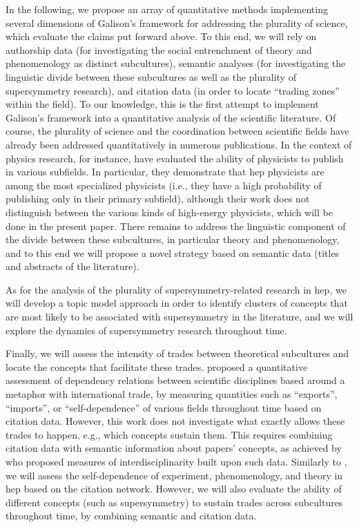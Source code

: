 \documentclass[smallextended]{svjour3}
\begin{document}
In the following, we propose an array of quantitative methods implementing several dimensions of Galison's framework for addressing the plurality of science, which evaluate the claims put forward above. To this end, we will rely on authorship data (for investigating the social entrenchment of theory and phenomenology as distinct subcultures), semantic analyses (for investigating the linguistic divide between these subcultures as well as the plurality of supersymmetry research), and citation data (in order to locate ``trading zones'' within the field). To our knowledge, this is the first attempt to implement Galison's framework into a quantitative analysis of the scientific literature. Of course, the plurality of science and the coordination between scientific fields have already been addressed quantitatively in numerous publications. In the context of physics research, for instance, \citet{Battiston2019} have evaluated the ability of physicists to publish in various subfields. In particular, they demonstrate that \gls{hep} physicists are among the most specialized physicists (i.e., they have a high probability of publishing only in their primary subfield), although their work does not distinguish between the various kinds of high-energy physicists, which will be done in the present paper. There remains to address the linguistic component of the divide between these subcultures, in particular theory and phenomenology, and to this end we will propose a novel strategy based on semantic data (titles and abstracts of the literature).

As for the analysis of the plurality of supersymmetry-related research in \gls{hep}, we will develop a topic model approach in order to identify clusters of concepts that are most likely to be associated with supersymmetry in the literature, and we will explore the dynamics of supersymmetry research throughout time.

Finally, we will assess the intensity of trades between theoretical subcultures and locate the concepts that facilitate these trades. \citet{Yan2013} proposed a quantitative assessment of dependency relations between scientific disciplines based around a metaphor with international trade, by measuring quantities such as ``exports'', ``imports'', or ``self-dependence'' of various fields throughout time based on citation data. However, this work does not investigate what exactly allows these trades to happen, e.g., which concepts sustain them. This requires combining citation data with semantic information about papers' concepts, as achieved by \citet{Raimbault2019} who proposed measures of interdisciplinarity built upon such data. Similarly to \citealt{Yan2013}, we will assess the self-dependence of experiment, phenomenology, and theory in \gls{hep} based on the citation network. However, we will also evaluate the ability of different concepts (such as supersymmetry) to sustain trades across subcultures throughout time, by combining semantic and citation data.
\end{document}
